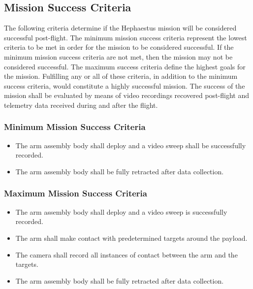 \documentclass[letterpaper,10pt]{article}
\begin{document}
\subsection{Mission Success Criteria}
The following criteria determine if the Hephaestus mission will be considered 
successful post-flight.
The minimum mission success criteria represent the lowest criteria to be met 
in order for the mission to be considered successful.
If the minimum mission success criteria are not met, then the mission may not 
be considered successful.
The maximum success criteria define the highest goals for the mission.
Fulfilling any or all of these criteria, in addition to the minimum success 
criteria, would constitute a highly successful mission.
The success of the mission shall be evaluated by means of video recordings 
recovered post-flight and telemetry data received during and after the flight.

\subsubsection{Minimum Mission Success Criteria}
\begin{itemize}
\item{The arm assembly body shall deploy and a video sweep shall be successfully recorded.}
\item{The arm assembly body shall be fully retracted after data collection.}
\end{itemize}

\subsubsection{Maximum Mission Success Criteria}
\begin{itemize}
\item{The arm assembly body shall deploy and a video sweep is successfully recorded.}
\item{The arm shall make contact with predetermined targets around the payload.}
\item{The camera shall record all instances of contact between the arm and the targets.}
\item{The arm assembly body shall be fully retracted after data collection.}
\end{itemize}
\end{document}
